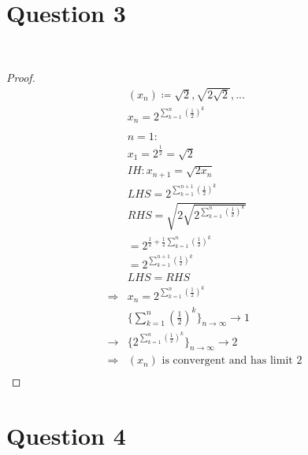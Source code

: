 \documentclass{article}
\begin{document}
\newpage

\section*{Question 3}

~

\begin{proof}
    \begin{align*}
        &(x_n)\coloneqq\sqrt{2},\sqrt{2\sqrt{2}},...\\
        &x_n=2^{\sum_{k=1}^{n}(\frac{1}{2})^k}\\
        &\\
        &n=1:\\
        &x_1=2^{\frac{1}{2}}=\sqrt{2}\\
        &IH:x_{n+1}=\sqrt{2x_{n}}\\
        &LHS=2^{\sum_{k=1}^{n+1}(\frac{1}{2})^k}\\
        &RHS=\sqrt{2\sqrt{2^{\sum_{k=1}^{n}(\frac{1}{2})^k}}}\\
        &=2^{\frac{1}{2}+\frac{1}{2}\sum_{k=1}^{n}(\frac{1}{2})^k}\\
        &=2^{\sum_{k=1}^{n+1}(\frac{1}{2})^k}\\
        &LHS=RHS\\
        \Rightarrow&x_n=2^{\sum_{k=1}^{n}(\frac{1}{2})^k}\\
        &\{\sum_{k=1}^{n}(\frac{1}{2})^k\}_{n\to\infty}\to1\\
        \rightarrow&\{2^{\sum_{k=1}^{n}(\frac{1}{2})^k}\}_{n\to\infty}\to2\\
        \Rightarrow&(x_n)\text{ is convergent and has limit }2\\
    \end{align*}
\end{proof}

\newpage

\section*{Question 4}

~
\end{document}
